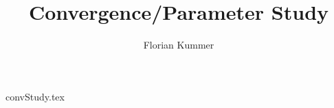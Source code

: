 \documentclass[10pt,a4paper]{article}
\title{Convergence/Parameter Study}
\author{Florian Kummer}
\begin{document}
\maketitle

{convStudy.tex}
\end{document}
